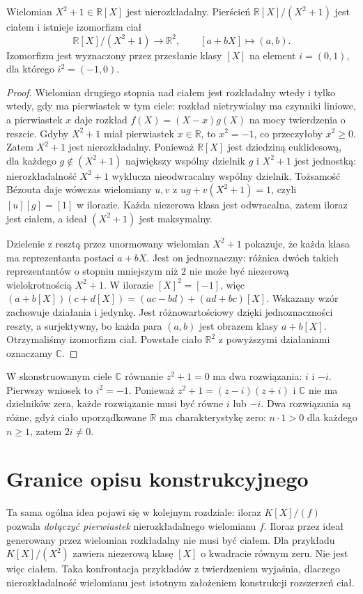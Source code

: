 \begin{twierdzenie}
\label{aa:tw:complex-quotient}
Wielomian $X^2+1\in\mathbb R[X]$ jest nierozkładalny.
Pierścień $\mathbb R[X]/(X^2+1)$ jest ciałem i istnieje
izomorfizm ciał
\[
\mathbb R[X]/(X^2+1)\longrightarrow\mathbb R^2,
\qquad [a+bX]\longmapsto(a,b).
\]
Izomorfizm jest wyznaczony przez przesłanie klasy
$[X]$ na element $i=(0,1)$, dla którego $i^2=(-1,0)$.
\end{twierdzenie}
\begin{proof}
Wielomian drugiego stopnia nad ciałem jest rozkładalny
wtedy i tylko wtedy, gdy ma pierwiastek w tym ciele:
rozkład nietrywialny ma czynniki liniowe, a pierwiastek
$x$ daje rozkład $f(X)=(X-x)g(X)$ na mocy
twierdzenia o reszcie.
Gdyby $X^2+1$ miał pierwiastek $x\in\mathbb R$,
to $x^2=-1$, co przeczyłoby $x^2\ge0$.
Zatem $X^2+1$ jest nierozkładalny. Ponieważ $\mathbb R[X]$ jest dziedziną euklidesową,
dla każdego $g\notin(X^2+1)$ największy wspólny dzielnik
$g$ i $X^2+1$ jest jednostką: nierozkładalność $X^2+1$
wyklucza nieodwracalny wspólny dzielnik.
Tożsamość Bézouta daje wówczas wielomiany $u,v$ z
$ug+v(X^2+1)=1$, czyli $[u][g]=[1]$ w ilorazie.
Każda niezerowa klasa jest odwracalna, zatem iloraz
jest ciałem, a ideał $(X^2+1)$ jest maksymalny.

Dzielenie z resztą przez unormowany wielomian
$X^2+1$ pokazuje, że każda klasa ma reprezentanta
postaci $a+bX$. Jest on jednoznaczny: różnica dwóch
takich reprezentantów o stopniu mniejszym niż $2$
nie może być niezerową wielokrotnością $X^2+1$. W ilorazie
$[X]^2=[-1]$, więc
$(a+b[X])(c+d[X])=(ac-bd)+(ad+bc)[X]$.
Wskazany wzór zachowuje działania i jedynkę.
Jest różnowartościowy dzięki jednoznaczności reszty,
a surjektywny, bo każda para $(a,b)$ jest obrazem
klasy $a+b[X]$. Otrzymaliśmy izomorfizm ciał. Powstałe ciało
$\mathbb R^2$ z powyższymi działaniami oznaczamy
$\mathbb C$.
\end{proof}

\begin{przyklad}
\label{aa:prz:complex-square-root}
W skonstruowanym ciele $\mathbb C$ równanie
$z^2+1=0$ ma dwa rozwiązania: $i$ i $-i$.
Pierwszy wniosek to $i^2=-1$. Ponieważ
$z^2+1=(z-i)(z+i)$ i $\mathbb C$ nie ma dzielników
zera, każde rozwiązanie musi być równe $i$ lub $-i$.
Dwa rozwiązania są różne, gdyż ciało uporządkowane
$\mathbb R$ ma charakterystykę zero:
$n\cdot1>0$ dla każdego $n\ge1$, zatem $2i\ne0$.
\end{przyklad}

\section{Granice opisu konstrukcyjnego}
Ta sama ogólna idea pojawi się w kolejnym rozdziale:
iloraz $K[X]/(f)$ pozwala \emph{dołączyć pierwiastek}
nierozkładalnego wielomianu $f$. Iloraz przez ideał generowany przez wielomian rozkładalny
nie musi być ciałem.
Dla przykładu $K[X]/(X^2)$ zawiera niezerową klasę
$[X]$ o kwadracie równym zeru. Nie jest więc ciałem.
Taka konfrontacja przykładów z twierdzeniem wyjaśnia,
dlaczego nierozkładalność wielomianu jest istotnym
założeniem konstrukcji rozszerzeń ciał.

\setlength{\parskip}{4pt}
